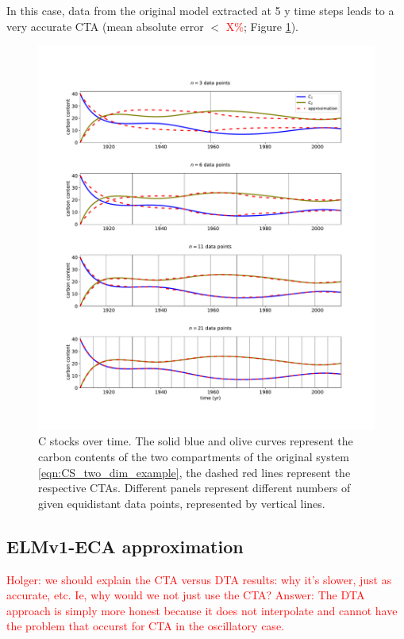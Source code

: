 \documentclass[11pt,a4paper]{article}
\newcommand{\red}[1]{\textcolor{red}{#1}}
\begin{document}
     In this case, data from the original model extracted at 5 y time steps leads to a very accurate CTA (mean absolute error $<$ \red{X\%}; Figure \ref{fig:CS_two_dim_example}).
    \begin{figure}[htbp]
        \centering 
        \includegraphics[width=1.0\linewidth]{figs/interpol_pwc_2.pdf}
        \caption{C stocks over time.
            The solid blue and olive curves represent the carbon contents of the two compartments of the original system \eqref{eqn:CS_two_dim_example}, the dashed red lines represent the respective CTAs. Different panels represent different numbers of given equidistant data points, represented by vertical lines.
            }
        \label{fig:CS_two_dim_example}
    \end{figure}        

\subsection{ELMv1-ECA approximation}
\red{Holger: we should explain the CTA versus DTA results: why it's slower, just as accurate, etc. Ie, why would we not just use the CTA? Answer: The DTA approach is simply more honest because it does not interpolate and cannot have the problem that occurst for CTA in the oscillatory case.}
\end{document}
